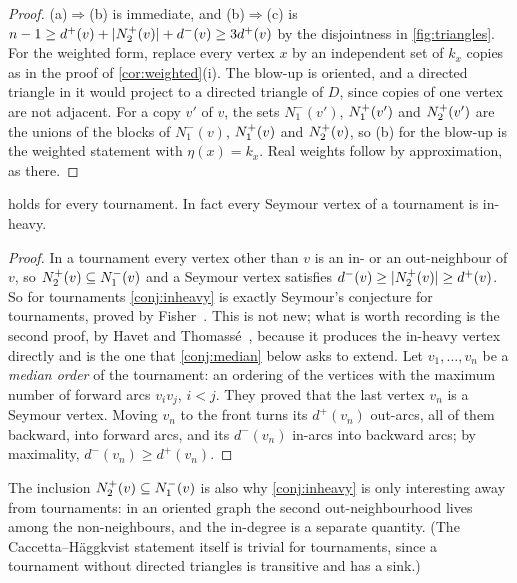 \begin{proof}
(a)$\Rightarrow$(b) is immediate, and (b)$\Rightarrow$(c) is
$n-1\ge d^+(v)+\lvert N^+_2(v)\rvert+d^-(v)\ge3d^+(v)$ by the disjointness in
\cref{fig:triangles}. For the weighted form, replace every vertex $x$ by an independent
set of $k_x$ copies as in the proof of \cref{cor:weighted}(i). The blow-up is oriented,
and a directed triangle in it would project to a directed triangle of $D$, since copies
of one vertex are not adjacent. For a copy $v'$ of $v$, the sets $N^-_1(v')$, $N^+_1(v')$
and $N^+_2(v')$ are the unions of the blocks of $N^-_1(v)$, $N^+_1(v)$ and $N^+_2(v)$, so
(b) for the blow-up is the weighted statement with $\eta(x)=k_x$. Real weights follow by
approximation, as there.
\end{proof}

\begin{proposition}[Tournaments]\label{prop:tournament-inheavy}
 holds for every tournament. In fact every Seymour vertex of a
tournament is in-heavy.
\end{proposition}

\begin{proof}
In a tournament every vertex other than $v$ is an in- or an out-neighbour of $v$, so
$N^+_2(v)\subseteq N^-_1(v)$ and a Seymour vertex satisfies
$d^-(v)\ge\lvert N^+_2(v)\rvert\ge d^+(v)$. So for tournaments \cref{conj:inheavy} is exactly
Seymour's conjecture for tournaments, proved by Fisher~\cite{Fisher1996}. This is not
new; what is worth recording is the second proof, by Havet and
Thomass\'e~\cite{HavetThomasse2000}, because it produces the in-heavy vertex
directly and is the one that \cref{conj:median} below asks to extend. Let
$v_1,\dots,v_n$ be a \emph{median order} of the tournament: an ordering of the
vertices with the maximum number of forward arcs $v_iv_j$, $i<j$. They proved that
the last vertex $v_n$ is a Seymour vertex. Moving $v_n$ to the front turns its
$d^+(v_n)$ out-arcs, all of them backward, into forward arcs, and its $d^-(v_n)$
in-arcs into backward arcs; by maximality, $d^-(v_n)\ge d^+(v_n)$.
\end{proof}

The inclusion $N^+_2(v)\subseteq N^-_1(v)$ is also why \cref{conj:inheavy} is only
interesting away from tournaments: in an oriented graph the second out-neighbourhood
lives among the non-neighbours, and the in-degree is a separate quantity. (The
Caccetta--H\"aggkvist statement itself is trivial for tournaments, since a tournament
without directed triangles is transitive and has a sink.)

